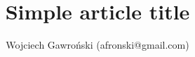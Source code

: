 \documentclass[11pt,a4paper]{article}
\title{Simple article title}
\author{Wojciech Gawroński (afronski@gmail.com)}
\begin{document}
	\maketitle
	\newpage

	\tableofcontents
	\newpage

\begin{thebibliography}{99}
\end{thebibliography}
\end{document}
